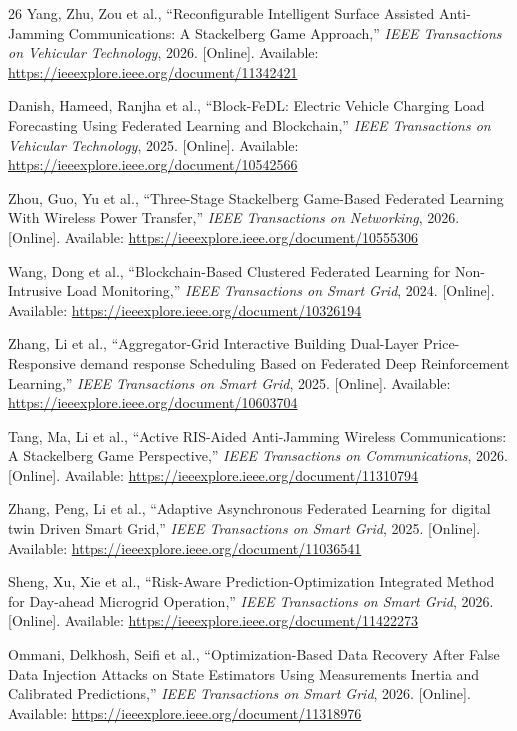\documentclass[journal]{IEEEtran}
\begin{document}
\begin{thebibliography}{26}
Yang, Zhu, Zou et al., ``Reconfigurable Intelligent Surface Assisted Anti-Jamming Communications: A Stackelberg Game Approach,'' \textit{IEEE Transactions on Vehicular Technology}, 2026. [Online]. Available: \url{https://ieeexplore.ieee.org/document/11342421}

Danish, Hameed, Ranjha et al., ``Block-FeDL: Electric Vehicle Charging Load Forecasting Using Federated Learning and Blockchain,'' \textit{IEEE Transactions on Vehicular Technology}, 2025. [Online]. Available: \url{https://ieeexplore.ieee.org/document/10542566}

Zhou, Guo, Yu et al., ``Three-Stage Stackelberg Game-Based Federated Learning With Wireless Power Transfer,'' \textit{IEEE Transactions on Networking}, 2026. [Online]. Available: \url{https://ieeexplore.ieee.org/document/10555306}

Wang, Dong et al., ``Blockchain-Based Clustered Federated Learning for Non-Intrusive Load Monitoring,'' \textit{IEEE Transactions on Smart Grid}, 2024. [Online]. Available: \url{https://ieeexplore.ieee.org/document/10326194}

Zhang, Li et al., ``Aggregator-Grid Interactive Building Dual-Layer Price-Responsive demand response Scheduling Based on Federated Deep Reinforcement Learning,'' \textit{IEEE Transactions on Smart Grid}, 2025. [Online]. Available: \url{https://ieeexplore.ieee.org/document/10603704}

Tang, Ma, Li et al., ``Active RIS-Aided Anti-Jamming Wireless Communications: A Stackelberg Game Perspective,'' \textit{IEEE Transactions on Communications}, 2026. [Online]. Available: \url{https://ieeexplore.ieee.org/document/11310794}

Zhang, Peng, Li et al., ``Adaptive Asynchronous Federated Learning for digital twin Driven Smart Grid,'' \textit{IEEE Transactions on Smart Grid}, 2025. [Online]. Available: \url{https://ieeexplore.ieee.org/document/11036541}

Sheng, Xu, Xie et al., ``Risk-Aware Prediction-Optimization Integrated Method for Day-ahead Microgrid Operation,'' \textit{IEEE Transactions on Smart Grid}, 2026. [Online]. Available: \url{https://ieeexplore.ieee.org/document/11422273}

Ommani, Delkhosh, Seifi et al., ``Optimization-Based Data Recovery After False Data Injection Attacks on State Estimators Using Measurements Inertia and Calibrated Predictions,'' \textit{IEEE Transactions on Smart Grid}, 2026. [Online]. Available: \url{https://ieeexplore.ieee.org/document/11318976}


\end{thebibliography}
\end{document}
